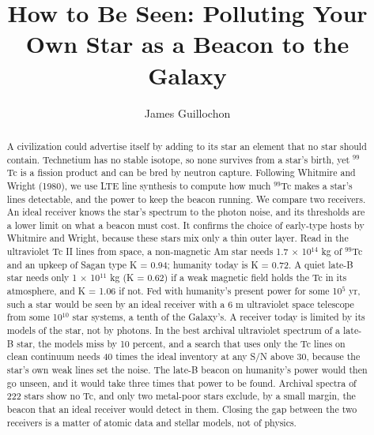 \documentclass[final,5p]{elsarticle}
\begin{document}
\begin{frontmatter}

\title{How to Be Seen: Polluting Your Own Star as a Beacon to the Galaxy}

\author[aff1]{James Guillochon}

\begin{abstract}
A civilization could advertise itself by adding to its star an element that no star should contain. Technetium has no stable isotope, so none survives from a star's birth, yet $^{99}$Tc is a fission product and can be bred by neutron capture. Following Whitmire and Wright (1980), we use LTE line synthesis to compute how much $^{99}$Tc makes a star's lines detectable, and the power to keep the beacon running. We compare two receivers. An ideal receiver knows the star's spectrum to the photon noise, and its thresholds are a lower limit on what a beacon must cost. It confirms the choice of early-type hosts by Whitmire and Wright, because these stars mix only a thin outer layer. Read in the ultraviolet Tc II lines from space, a non-magnetic Am star needs 1.7 $\times$ 10$^{14}$ kg of $^{99}$Tc and an upkeep of Sagan type K = 0.94; humanity today is K = 0.72. A quiet late-B star needs only 1 $\times$ 10$^{11}$ kg (K = 0.62) if a weak magnetic field holds the Tc in its atmosphere, and K = 1.06 if not. Fed with humanity's present power for some 10$^{5}$ yr, such a star would be seen by an ideal receiver with a 6 m ultraviolet space telescope from some 10$^{10}$ star systems, a tenth of the Galaxy's. A receiver today is limited by its models of the star, not by photons. In the best archival ultraviolet spectrum of a late-B star, the models miss by 10 percent, and a search that uses only the Tc lines on clean continuum needs 40 times the ideal inventory at any S/N above 30, because the star's own weak lines set the noise. The late-B beacon on humanity's power would then go unseen, and it would take three times that power to be found. Archival spectra of 222 stars show no Tc, and only two metal-poor stars exclude, by a small margin, the beacon that an ideal receiver would detect in them. Closing the gap between the two receivers is a matter of atomic data and stellar models, not of physics.
\end{abstract}


\end{frontmatter}
\end{document}
